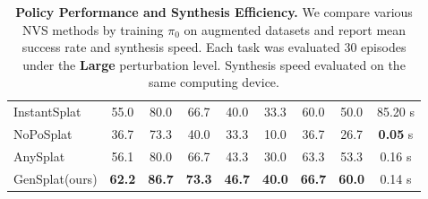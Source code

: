 \begin{table}[t]
{\begin{tabular}{l | c | c c c c c c | c}
        InstantSplat~\cite{fan2024instantsplat} & 55.0 & 80.0 & 66.7 & 40.0 & 33.3 & 60.0 & 50.0 & 85.20 s \\

        NoPoSplat~\cite{ye2024no} & 36.7 & 73.3 & 40.0 & 33.3 & 10.0 & 36.7 & 26.7 & \textbf{0.05} s \\

        AnySplat~\cite{jiang2025anysplat} & 56.1 & 80.0 & 66.7 & 43.3 & 30.0 & 63.3 & 53.3 & 0.16 s \\

        \midrule 
        GenSplat(ours) & \textbf{62.2} & \textbf{86.7} & \textbf{73.3} & \textbf{46.7} & \textbf{40.0} & \textbf{66.7} & \textbf{60.0} & 0.14 s \\ 
        \bottomrule 

        \end{tabular}
    }
    \caption{\textbf{Policy Performance and Synthesis Efficiency.} We compare various NVS methods by training \(\pi_0\) on augmented datasets and report mean success rate and synthesis speed. Each task was evaluated 30 episodes under the \textbf{Large} perturbation level. Synthesis speed evaluated on the same computing device.}
    \label{tab:RQ4}
    \vspace{-6ex}
\end{table}
